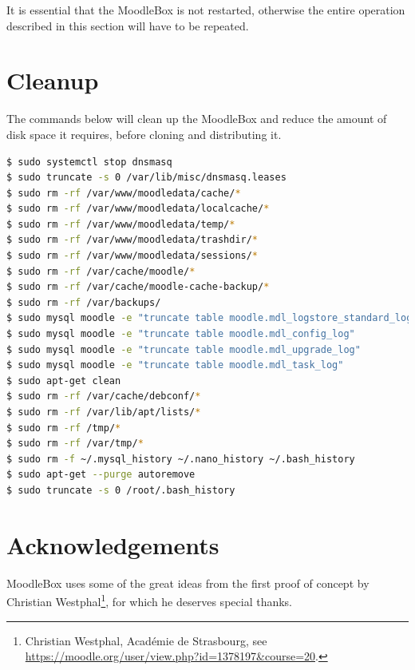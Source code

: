 \documentclass[12pt]{article}
\begin{document}
It is essential that the MoodleBox is not restarted, otherwise the entire operation described in this section will have to be repeated.

\section{Cleanup}

The commands below will clean up the MoodleBox and reduce the amount of disk space it requires, before cloning and distributing it.

\begin{lstlisting}[language=bash]
$ sudo systemctl stop dnsmasq
$ sudo truncate -s 0 /var/lib/misc/dnsmasq.leases
$ sudo rm -rf /var/www/moodledata/cache/*
$ sudo rm -rf /var/www/moodledata/localcache/*
$ sudo rm -rf /var/www/moodledata/temp/*
$ sudo rm -rf /var/www/moodledata/trashdir/*
$ sudo rm -rf /var/www/moodledata/sessions/*
$ sudo rm -rf /var/cache/moodle/*
$ sudo rm -rf /var/cache/moodle-cache-backup/*
$ sudo rm -rf /var/backups/
$ sudo mysql moodle -e "truncate table moodle.mdl_logstore_standard_log"
$ sudo mysql moodle -e "truncate table moodle.mdl_config_log"
$ sudo mysql moodle -e "truncate table moodle.mdl_upgrade_log"
$ sudo mysql moodle -e "truncate table moodle.mdl_task_log"
$ sudo apt-get clean
$ sudo rm -rf /var/cache/debconf/*
$ sudo rm -rf /var/lib/apt/lists/*
$ sudo rm -rf /tmp/*
$ sudo rm -rf /var/tmp/*
$ sudo rm -f ~/.mysql_history ~/.nano_history ~/.bash_history
$ sudo apt-get --purge autoremove
$ sudo truncate -s 0 /root/.bash_history
\end{lstlisting}

\section{Acknowledgements}

MoodleBox uses some of the great ideas from the first  proof of concept by Christian Westphal\footnote{Christian Westphal, Académie de Strasbourg, see \url{https://moodle.org/user/view.php?id=1378197&course=20}.}, for which he deserves special thanks.
\end{document}
